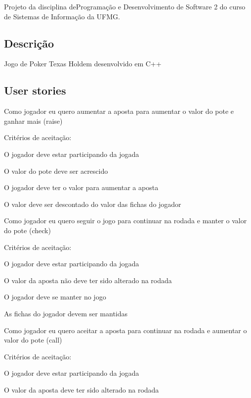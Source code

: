 Projeto da disciplina de\+Programação e Desenvolvimento de Software 2 do curso de Sistemas de Informação da U\+F\+MG.

\subsection*{Descrição}

Jogo de Poker Texas Hold\textquotesingle{}em desenvolvido em C++

\subsection*{User stories}


\begin{DoxyItemize}
\item Como jogador eu quero aumentar a aposta para aumentar o valor do pote e ganhar mais (raise)
\item Critérios de aceitação\+:
\begin{DoxyItemize}
\item O jogador deve estar participando da jogada
\item O valor do pote deve ser acrescido
\item O jogador deve ter o valor para aumentar a aposta
\item O valor deve ser descontado do valor das fichas do jogador
\end{DoxyItemize}
\item Como jogador eu quero seguir o jogo para continuar na rodada e manter o valor do pote (check)
\item Critérios de aceitação\+:
\begin{DoxyItemize}
\item O jogador deve estar participando da jogada
\item O valor da aposta não deve ter sido alterado na rodada
\item O jogador deve se manter no jogo
\item As fichas do jogador devem ser mantidas
\end{DoxyItemize}
\item Como jogador eu quero aceitar a aposta para continuar na rodada e aumentar o valor do pote (call)
\item Critérios de aceitação\+:
\begin{DoxyItemize}
\item O jogador deve estar participando da jogada
\item O valor da aposta deve ter sido alterado na rodada

\end{DoxyItemize}
\end{DoxyItemize}
